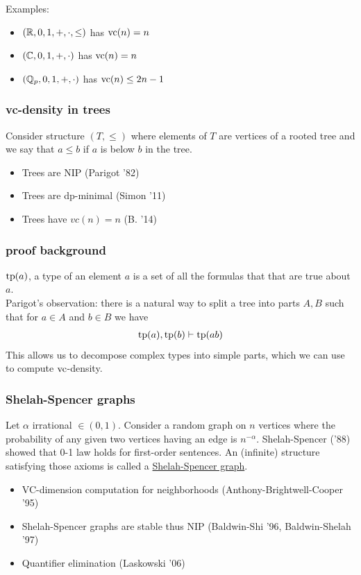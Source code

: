 \documentclass{beamer}
\newcommand{\defn}{\underline}
\begin{document}
\begin{frame}
  Examples:
  \begin{itemize}
  \item $(\mathbb{R}, 0, 1, +, \cdot, \leq)$ has $\operatorname{vc}(n) = n$
  \item $(\mathbb{C}, 0, 1, +, \cdot)$ has $\operatorname{vc}(n) = n$
  \item $(\mathbb{Q}_p, 0, 1, +, \cdot)$ has $\operatorname{vc}(n) \leq 2n - 1$
  \end{itemize}
\end{frame}

\begin{frame}
  \frametitle{vc-density in trees}
  Consider structure $(T, \leq)$ where elements of $T$ are vertices of a rooted tree and we say that $a \leq b$ if $a$ is below $b$ in the tree.
  \begin{itemize}
  \item Trees are NIP (Parigot '82)
  \item Trees are dp-minimal (Simon '11)
  \item Trees have $vc(n) = n$ (B. '14)
  \end{itemize}
\end{frame}

\begin{frame}
  \frametitle{proof background}
  $\operatorname{tp}(a)$, a type of an element $a$ is a set of all the formulas that that are true about $a$.\\
  Parigot's observation: there is a natural way to split a tree into parts $A, B$ such that for $a \in A$ and $b \in B$ we have
  \begin{align*}
    \operatorname{tp}(a), \operatorname{tp}(b) \vdash \operatorname{tp}(ab)
  \end{align*}
  This allows us to decompose complex types into simple parts, which we can use to compute $\operatorname{vc}$-density.
\end{frame}

\begin{frame}
  \frametitle{Shelah-Spencer graphs}
  Let $\alpha$ irrational $\in (0,1)$. Consider a random graph on $n$ vertices where the probability of any given two vertices having an edge is $n^{-\alpha}$. Shelah-Spencer ('88) showed that 0-1 law holds for first-order sentences. An (infinite) structure satisfying those axioms is called a \defn{Shelah-Spencer graph}.
  \begin{itemize}
  \item VC-dimension computation for neighborhoods (Anthony-Brightwell-Cooper '95)
  \item Shelah-Spencer graphs are stable thus NIP (Baldwin-Shi '96, Baldwin-Shelah '97)
  \item Quantifier elimination (Laskowski '06)
  \end{itemize}
\end{frame}
\end{document}
